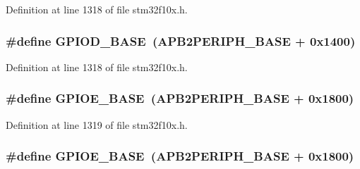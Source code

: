 Definition at line 1318 of file stm32f10x.\+h.

\subsubsection[{\texorpdfstring{G\+P\+I\+O\+D\+\_\+\+B\+A\+SE}{GPIOD_BASE}}]{\setlength{\rightskip}{0pt plus 5cm}\#define G\+P\+I\+O\+D\+\_\+\+B\+A\+SE~({\bf A\+P\+B2\+P\+E\+R\+I\+P\+H\+\_\+\+B\+A\+SE} + 0x1400)}\hypertarget{group___peripheral__memory__map_ga1a93ab27129f04064089616910c296ec}{}\label{group___peripheral__memory__map_ga1a93ab27129f04064089616910c296ec}


Definition at line 1318 of file stm32f10x.\+h.

\subsubsection[{\texorpdfstring{G\+P\+I\+O\+E\+\_\+\+B\+A\+SE}{GPIOE_BASE}}]{\setlength{\rightskip}{0pt plus 5cm}\#define G\+P\+I\+O\+E\+\_\+\+B\+A\+SE~({\bf A\+P\+B2\+P\+E\+R\+I\+P\+H\+\_\+\+B\+A\+SE} + 0x1800)}\hypertarget{group___peripheral__memory__map_gab487b1983d936c4fee3e9e88b95aad9d}{}\label{group___peripheral__memory__map_gab487b1983d936c4fee3e9e88b95aad9d}


Definition at line 1319 of file stm32f10x.\+h.

\subsubsection[{\texorpdfstring{G\+P\+I\+O\+E\+\_\+\+B\+A\+SE}{GPIOE_BASE}}]{\setlength{\rightskip}{0pt plus 5cm}\#define G\+P\+I\+O\+E\+\_\+\+B\+A\+SE~({\bf A\+P\+B2\+P\+E\+R\+I\+P\+H\+\_\+\+B\+A\+SE} + 0x1800)}\hypertarget{group___peripheral__memory__map_gab487b1983d936c4fee3e9e88b95aad9d}{}\label{group___peripheral__memory__map_gab487b1983d936c4fee3e9e88b95aad9d}


